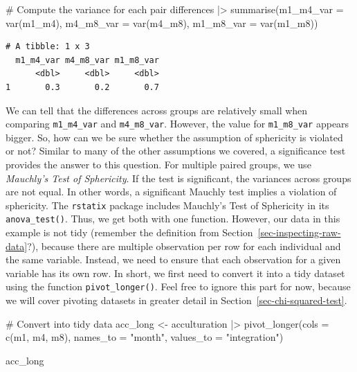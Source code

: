 \documentclass[
  letterpaper,
]{krantz}
\makeatletter
\newenvironment{Shaded}{\begin{snugshade}}{\end{snugshade}}
\newcommand{\AttributeTok}[1]{\textcolor[rgb]{0.40,0.45,0.13}{#1}}
\newcommand{\CommentTok}[1]{\textcolor[rgb]{0.37,0.37,0.37}{#1}}
\newcommand{\FunctionTok}[1]{\textcolor[rgb]{0.28,0.35,0.67}{#1}}
\newcommand{\NormalTok}[1]{\textcolor[rgb]{0.00,0.23,0.31}{#1}}
\newcommand{\OtherTok}[1]{\textcolor[rgb]{0.00,0.23,0.31}{#1}}
\newcommand{\SpecialCharTok}[1]{\textcolor[rgb]{0.37,0.37,0.37}{#1}}
\newcommand{\StringTok}[1]{\textcolor[rgb]{0.13,0.47,0.30}{#1}}
\newenvironment{kframe}{%
\medskip{}
\setlength{\fboxsep}{.8em}
 \def\at@end@of@kframe{}%
 \ifinner\ifhmode%
  \def\at@end@of@kframe{\end{minipage}}%
  \begin{minipage}{\columnwidth}%
 \fi\fi%
 \def\FrameCommand##1{\hskip\@totalleftmargin \hskip-\fboxsep
 \colorbox{shadecolor}{##1}\hskip-\fboxsep
     \hskip-\linewidth \hskip-\@totalleftmargin \hskip\columnwidth}%
 \MakeFramed {\advance\hsize-\width
   \@totalleftmargin\z@ \linewidth\hsize
   \@setminipage}}%
 {\par\unskip\endMakeFramed%
 \at@end@of@kframe}
\renewenvironment{Shaded}{\begin{kframe}}{\end{kframe}}
\makeatother
\begin{document}
\begin{Shaded}
\begin{Highlighting}[]
\CommentTok{\# Compute the variance for each pair}
\NormalTok{differences }\SpecialCharTok{|\textgreater{}}
  \FunctionTok{summarise}\NormalTok{(}\AttributeTok{m1\_m4\_var =} \FunctionTok{var}\NormalTok{(m1\_m4),}
            \AttributeTok{m4\_m8\_var =} \FunctionTok{var}\NormalTok{(m4\_m8),}
            \AttributeTok{m1\_m8\_var =} \FunctionTok{var}\NormalTok{(m1\_m8))}
\end{Highlighting}
\end{Shaded}

\begin{verbatim}
# A tibble: 1 x 3
  m1_m4_var m4_m8_var m1_m8_var
      <dbl>     <dbl>     <dbl>
1       0.3       0.2       0.7
\end{verbatim}

We can tell that the differences across groups are relatively small when
comparing \texttt{m1\_m4\_var} and \texttt{m4\_m8\_var}. However, the
value for \texttt{m1\_m8\_var} appears bigger. So, how can we be sure
whether the assumption of sphericity is violated or not? Similar to many
of the other assumptions we covered, a significance test provides the
answer to this question. For multiple paired groups, we use
\emph{Mauchly's Test of Sphericity}. If the test is significant, the
variances across groups are not equal. In other words, a significant
Mauchly test implies a violation of sphericity. The \texttt{rstatix}
package includes Mauchly's Test of Sphericity in its
\texttt{anova\_test()}. Thus, we get both with one function. However,
our data in this example is not tidy (remember the definition from
Section~\ref{sec-inspecting-raw-data}?), because there are multiple
observation per row for each individual and the same variable. Instead,
we need to ensure that each observation for a given variable has its own
row. In short, we first need to convert it into a tidy dataset using the
function \texttt{pivot\_longer()}. Feel free to ignore this part for
now, because we will cover pivoting datasets in greater detail in
Section~\ref{sec-chi-squared-test}.

\begin{Shaded}
\begin{Highlighting}[]
\CommentTok{\# Convert into tidy data}
\NormalTok{acc\_long }\OtherTok{\textless{}{-}}
\NormalTok{  acculturation }\SpecialCharTok{|\textgreater{}}
  \FunctionTok{pivot\_longer}\NormalTok{(}\AttributeTok{cols =} \FunctionTok{c}\NormalTok{(m1, m4, m8),}
               \AttributeTok{names\_to =} \StringTok{"month"}\NormalTok{,}
               \AttributeTok{values\_to =} \StringTok{"integration"}\NormalTok{)}

\NormalTok{acc\_long}
\end{Highlighting}
\end{Shaded}
\end{document}

